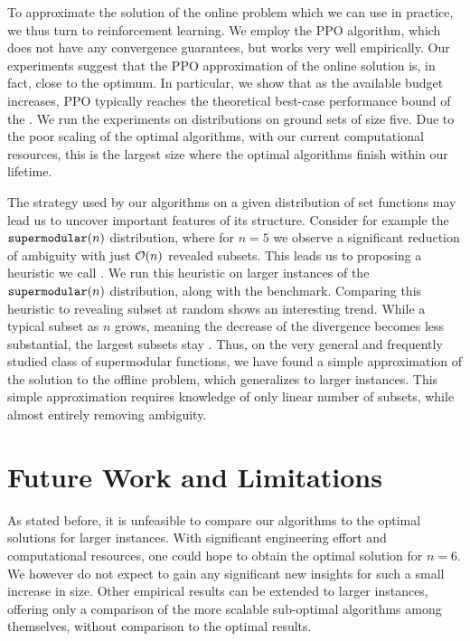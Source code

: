 To approximate the solution of the online problem which we can use in practice, we thus turn to reinforcement learning.
We employ the PPO algorithm, which does not have any convergence guarantees, but works very well empirically.
Our experiments suggest that the PPO approximation of the online solution is, in fact, close to the optimum.
In particular, we show that as the available budget increases, PPO typically reaches the theoretical best-case performance bound of the \algRO{}.
We run the experiments on distributions on ground sets of size five.
Due to the poor scaling of the optimal algorithms, with our current computational resources, this is the largest size where the optimal algorithms finish within our lifetime.

The strategy used by our algorithms on a given distribution of set functions may lead us to uncover important features of its structure.
Consider for example the $\texttt{supermodular}\!\left(n\right)$ distribution, where for $ n=5 $ we observe a significant reduction of ambiguity with just $ \mathcal{O}\!\left(n\right) $ revealed subsets.
This leads us to proposing a heuristic we call .
We run this heuristic on larger instances of the $ \texttt{supermodular}\!\left(n\right) $ distribution,  along with the \algRand{} benchmark.
Comparing this heuristic to revealing subset at random shows an interesting trend.
While a typical subset  as $n$ grows, meaning the decrease of the divergence becomes less substantial, the largest subsets stay .
Thus, on the very general and frequently studied class of supermodular functions, we have found a simple approximation of the solution to the offline problem, which generalizes to larger instances.
This simple approximation requires knowledge of only linear number of subsets, while almost entirely removing ambiguity.

\section*{Future Work and Limitations}

As stated before, it is unfeasible to compare our algorithms to the optimal solutions for larger instances.
With significant engineering effort and computational resources, one could hope to obtain the optimal solution for $n=6$.
We however do not expect to gain any significant new insights for such a small increase in size.
Other empirical results can be extended to larger instances, offering only a comparison of the more scalable sub-optimal algorithms among themselves, without comparison to the optimal results.

